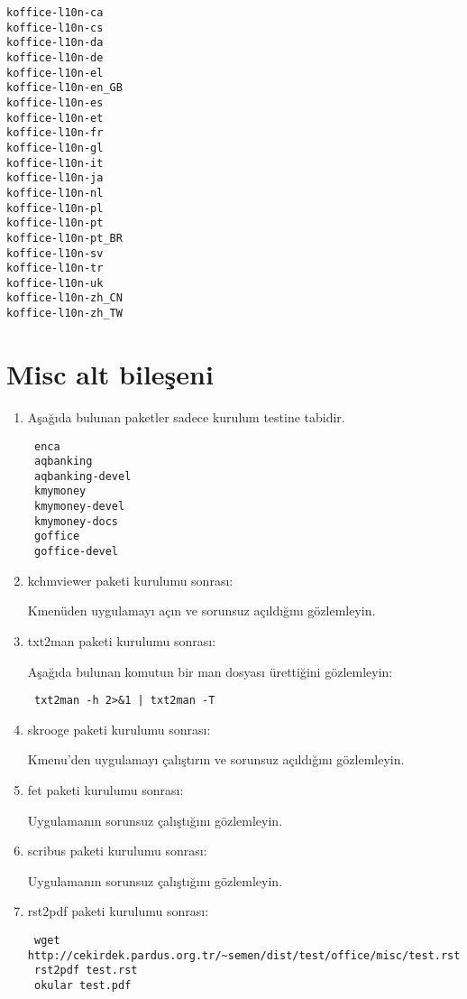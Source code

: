 \documentclass[a4paper,10pt]{article}
\begin{document}
\begin{verbatim}
koffice-l10n-ca
koffice-l10n-cs
koffice-l10n-da
koffice-l10n-de
koffice-l10n-el
koffice-l10n-en_GB
koffice-l10n-es
koffice-l10n-et
koffice-l10n-fr
koffice-l10n-gl
koffice-l10n-it
koffice-l10n-ja
koffice-l10n-nl
koffice-l10n-pl
koffice-l10n-pt
koffice-l10n-pt_BR
koffice-l10n-sv
koffice-l10n-tr
koffice-l10n-uk
koffice-l10n-zh_CN
koffice-l10n-zh_TW
\end{verbatim}

\section{Misc alt bileşeni}
\begin{enumerate}

\item Aşağıda bulunan paketler sadece kurulum testine tabidir.

\begin{verbatim}
 enca
 aqbanking
 aqbanking-devel
 kmymoney
 kmymoney-devel
 kmymoney-docs
 goffice
 goffice-devel
\end{verbatim}

\item kchmviewer paketi kurulumu sonrası:

Kmenüden uygulamayı açın ve sorunsuz açıldığını gözlemleyin.

\item txt2man paketi kurulumu sonrası:

Aşağıda bulunan komutun bir man dosyası ürettiğini gözlemleyin:

\begin{verbatim}
 txt2man -h 2>&1 | txt2man -T
\end{verbatim}

\item skrooge paketi kurulumu sonrası:

Kmenu'den uygulamayı çalıştırın ve sorunsuz açıldığını gözlemleyin.

\item fet paketi kurulumu sonrası:

Uygulamanın sorunsuz çalıştığını gözlemleyin.

\item scribus paketi kurulumu sonrası:

Uygulamanın sorunsuz çalıştığını gözlemleyin.

\item rst2pdf paketi kurulumu sonrası:

\begin{verbatim}
 wget http://cekirdek.pardus.org.tr/~semen/dist/test/office/misc/test.rst
 rst2pdf test.rst
 okular test.pdf
\end{verbatim}


\end{enumerate}
\end{document}

